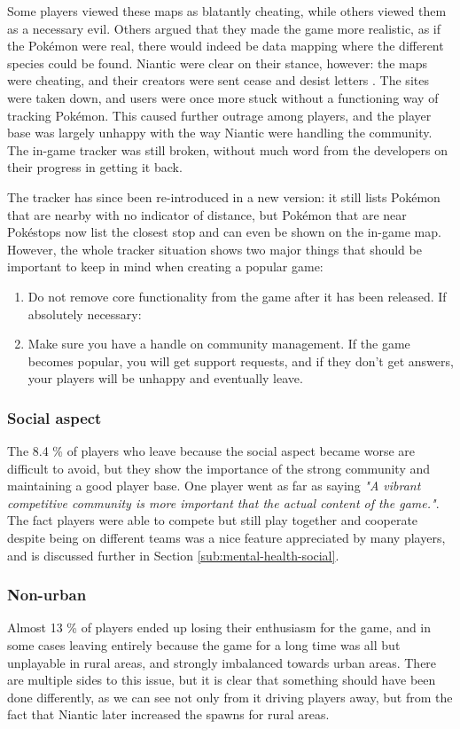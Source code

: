 Some players viewed these maps as blatantly cheating, while others viewed them as a necessary evil. Others argued that they made the game more realistic, as if the Pokémon were real, there would indeed be data mapping where the different species could be found. Niantic were clear on their stance, however: the maps were cheating, and their creators were sent cease and desist letters . The sites were taken down, and users were once more stuck without a functioning way of tracking Pokémon. This caused further outrage among players, and the player base was largely unhappy with the way Niantic were handling the community. The in-game tracker was still broken, without much word from the developers on their progress in getting it back.

The tracker has since been re-introduced in a new version: it still lists Pokémon that are nearby with no indicator of distance, but Pokémon that are near Pokéstops now list the closest stop and can even be shown on the in-game map. However, the whole tracker situation shows two major things that should be important to keep in mind when creating a popular game:

\begin{enumerate}
	\item Do not remove core functionality from the game after it has been released. If absolutely necessary:
	\item Make sure you have a handle on community management. If the game becomes popular, you will get support requests, and if they don't get answers, your players will be unhappy and eventually leave.
\end{enumerate}

\subsubsection{Social aspect}
The 8.4 \% of players who leave because the social aspect became worse are difficult to avoid, but they show the importance of the strong community and maintaining a good player base. One player went as far as saying \emph{"A vibrant competitive community is more important that the actual content of the game."}. The fact players were able to compete but still play together and cooperate despite being on different teams was a nice feature appreciated by many players, and is discussed further in Section \ref{sub:mental-health-social}.

\subsubsection{Non-urban}
\label{sec:the-rural-problem}
Almost 13 \% of players ended up losing their enthusiasm for the game, and in some cases leaving entirely because the game for a long time was all but unplayable in rural areas, and strongly imbalanced towards urban areas. There are multiple sides to this issue, but it is clear that something should have been done differently, as we can see not only from it driving players away, but from the fact that Niantic later increased the spawns for rural areas.

